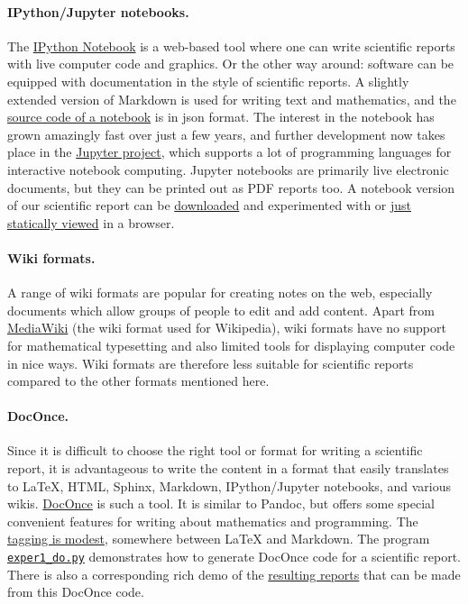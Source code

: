 \documentclass[graybox,sectrefs,envcountresetchap,open=right,final]{svmonodo}
\begin{document}

\paragraph{IPython/Jupyter notebooks.}
The \href{{http://ipython.org/notebook.html}}{IPython Notebook} is
a web-based tool where one can write scientific reports with live computer
code and graphics. Or the other way around: software can be equipped
with documentation in the style of scientific reports.
A slightly extended version of Markdown is used for writing text and
mathematics, and the \href{{http://tinyurl.com/nc4upel/_static/report.ipynb.html}}{source code of a notebook} is in json format.
The interest in the notebook has grown amazingly fast
over just a few years, and further development now takes place
in the \href{{https://jupyter.org/}}{Jupyter project}, which
supports a lot of programming languages for interactive notebook computing.
Jupyter notebooks are primarily live electronic documents, but they can be
printed out as PDF reports too.
A notebook version of our scientific report can be \href{{http://tinyurl.com/p96acy2/_static/report.ipynb}}{downloaded} and experimented with
or \href{{http://nbviewer.ipython.org/url/hplgit.github.com/teamods/writing_reports/_static/report.ipynb}}{just statically viewed} in a browser.

\paragraph{Wiki formats.}
A range of wiki formats are popular for creating notes on the web,
especially documents which allow groups of people to edit and add
content. Apart from \href{{http://www.mediawiki.org/wiki/MediaWiki}}{MediaWiki} (the wiki format used for
Wikipedia), wiki formats have no support for mathematical typesetting
and also limited tools for displaying computer code in nice ways.
Wiki formats are therefore less suitable for scientific reports compared
to the other formats mentioned here.


\paragraph{DocOnce.}
Since it is difficult to choose the right tool or format for writing a
scientific report, it is advantageous to write the content in a format
that easily translates to {\LaTeX}, HTML, Sphinx, Markdown,
IPython/Jupyter notebooks, and various wikis. \href{{https://github.com/hplgit/doconce}}{DocOnce} is such a tool. It is similar to
Pandoc, but offers some special convenient features for writing about
mathematics and programming.  The \href{{http://tinyurl.com/nc4upel/_static/report.do.txt.html}}{tagging is modest}, somewhere between
{\LaTeX} and Markdown.  The program \href{{http://tinyurl.com/p96acy2/exper1_do.py}}{\nolinkurl{exper1_do.py}} demonstrates how
to generate DocOnce code for a scientific report.
There is also a corresponding rich demo of the \href{{http://tinyurl.com/nc4upel/index.html}}{resulting reports} that can be made from
this DocOnce code.
\end{document}
